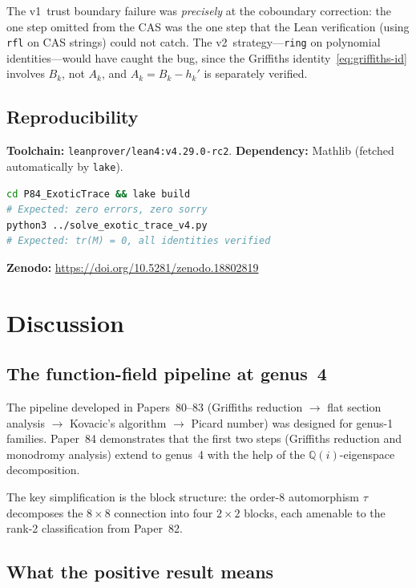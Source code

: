 \documentclass[11pt]{article}
\theoremstyle{plain}
\theoremstyle{definition}
\theoremstyle{remark}
\newcommand{\leanRepo}{\url{https://doi.org/10.5281/zenodo.18802819}}
\newcommand{\Q}{\mathbb{Q}}
\begin{document}
The v1~trust boundary failure was \emph{precisely} at the coboundary
correction: the one step omitted from the CAS was the one step that
the Lean verification (using \texttt{rfl} on CAS strings) could not
catch. The v2~strategy---\texttt{ring} on polynomial identities---would
have caught the bug, since the Griffiths identity~\eqref{eq:griffiths-id}
involves $B_k$, not $A_k$, and $A_k = B_k - h_k'$ is separately verified.

\subsection{Reproducibility}

\textbf{Toolchain:} \texttt{leanprover/lean4:v4.29.0-rc2}.
\textbf{Dependency:} Mathlib (fetched automatically by \texttt{lake}).

\begin{lstlisting}[language=bash,style=leanstyle,
  caption={Build and verify}]
cd P84_ExoticTrace && lake build
# Expected: zero errors, zero sorry
python3 ../solve_exotic_trace_v4.py
# Expected: tr(M) = 0, all identities verified
\end{lstlisting}

\noindent
\textbf{Zenodo:} \leanRepo

\section{Discussion}\label{sec:discussion}

\subsection{The function-field pipeline at genus~4}

The pipeline developed in Papers~80--83 (Griffiths reduction $\to$
flat section analysis $\to$ Kovacic's algorithm $\to$ Picard number)
was designed for genus-1 families. Paper~84 demonstrates that the
first two steps (Griffiths reduction and monodromy analysis) extend
to genus~4 with the help of the $\Q(i)$-eigenspace decomposition.

The key simplification is the block structure: the order-8 automorphism
$\tau$ decomposes the $8 \times 8$ connection into four $2 \times 2$
blocks, each amenable to the rank-2 classification from Paper~82.

\subsection{What the positive result means}
\end{document}
